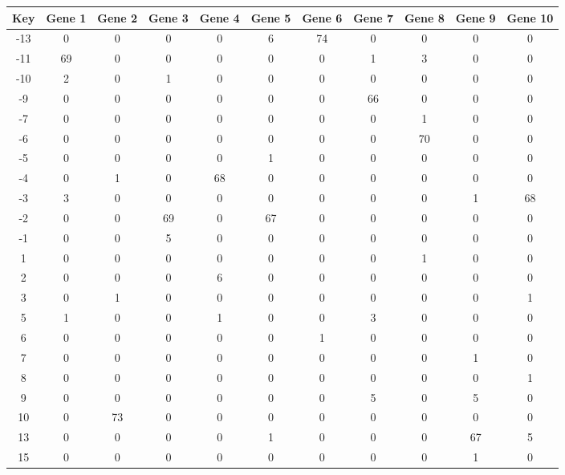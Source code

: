 \begin{tabular}{|c|c|c|c|c|c|c|c|c|c|c|}
\hline
Key & Gene 1 & Gene 2 & Gene 3 & Gene 4 & Gene 5 & Gene 6 & Gene 7 & Gene 8 & Gene 9 & Gene 10 \\
\hline
-13 & 0 & 0 & 0 & 0 & 6 & 74 & 0 & 0 & 0 & 0 \\
-11 & 69 & 0 & 0 & 0 & 0 & 0 & 1 & 3 & 0 & 0 \\
-10 & 2 & 0 & 1 & 0 & 0 & 0 & 0 & 0 & 0 & 0 \\
-9 & 0 & 0 & 0 & 0 & 0 & 0 & 66 & 0 & 0 & 0 \\
-7 & 0 & 0 & 0 & 0 & 0 & 0 & 0 & 1 & 0 & 0 \\
-6 & 0 & 0 & 0 & 0 & 0 & 0 & 0 & 70 & 0 & 0 \\
-5 & 0 & 0 & 0 & 0 & 1 & 0 & 0 & 0 & 0 & 0 \\
-4 & 0 & 1 & 0 & 68 & 0 & 0 & 0 & 0 & 0 & 0 \\
-3 & 3 & 0 & 0 & 0 & 0 & 0 & 0 & 0 & 1 & 68 \\
-2 & 0 & 0 & 69 & 0 & 67 & 0 & 0 & 0 & 0 & 0 \\
-1 & 0 & 0 & 5 & 0 & 0 & 0 & 0 & 0 & 0 & 0 \\
1 & 0 & 0 & 0 & 0 & 0 & 0 & 0 & 1 & 0 & 0 \\
2 & 0 & 0 & 0 & 6 & 0 & 0 & 0 & 0 & 0 & 0 \\
3 & 0 & 1 & 0 & 0 & 0 & 0 & 0 & 0 & 0 & 1 \\
5 & 1 & 0 & 0 & 1 & 0 & 0 & 3 & 0 & 0 & 0 \\
6 & 0 & 0 & 0 & 0 & 0 & 1 & 0 & 0 & 0 & 0 \\
7 & 0 & 0 & 0 & 0 & 0 & 0 & 0 & 0 & 1 & 0 \\
8 & 0 & 0 & 0 & 0 & 0 & 0 & 0 & 0 & 0 & 1 \\
9 & 0 & 0 & 0 & 0 & 0 & 0 & 5 & 0 & 5 & 0 \\
10 & 0 & 73 & 0 & 0 & 0 & 0 & 0 & 0 & 0 & 0 \\
13 & 0 & 0 & 0 & 0 & 1 & 0 & 0 & 0 & 67 & 5 \\
15 & 0 & 0 & 0 & 0 & 0 & 0 & 0 & 0 & 1 & 0 \\
\hline
\end{tabular}